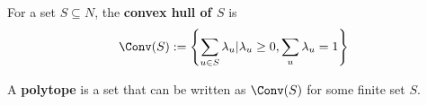 \begin{definition}
  \label{3-convex-hull}
  \uses{}
  \leanok
  For a set $S \subseteq N$, the {\bf convex hull of $S$} is
  $$\Conv(S) := \left\{\sum_{u \in S} \lambda_u | \lambda_u \ge 0, \sum_u \lambda_u = 1\right\}$$
\end{definition}

\begin{definition}[Polytope]
  \label{3-polytope}
  \leanok
  A {\bf polytope} is a set that can be written as $\Conv(S)$ for
  some finite set $S$.
\end{definition}
